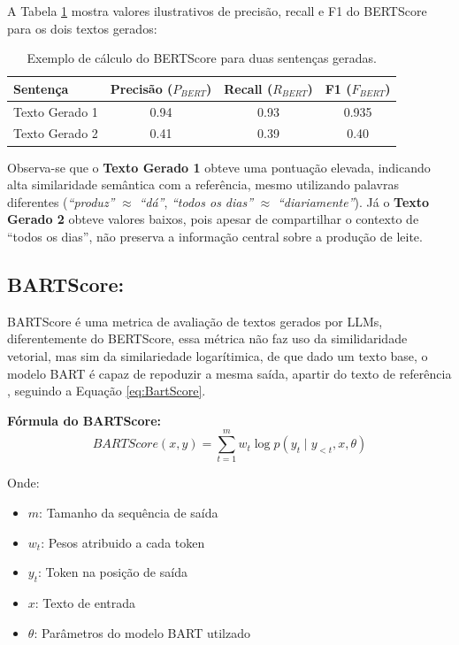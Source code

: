 A Tabela \ref{tab:exemplo_bertscore} mostra valores ilustrativos de precisão, recall e F1 do BERTScore para os dois textos gerados:

\begin{table}[H]
    \centering
    \begin{tabular}{lccc}
        \toprule
        \textbf{Sentença} & \textbf{Precisão ($P_{BERT}$)} & \textbf{Recall ($R_{BERT}$)} & \textbf{F1 ($F_{BERT}$)} \\
        \midrule
        Texto Gerado 1 & 0.94 & 0.93 & 0.935 \\
        Texto Gerado 2 & 0.41 & 0.39 & 0.40 \\
        \bottomrule
    \end{tabular}
    \caption{Exemplo de cálculo do BERTScore para duas sentenças geradas.}
    \label{tab:exemplo_bertscore}
\end{table}

Observa-se que o \textbf{Texto Gerado 1} obteve uma pontuação elevada, indicando alta similaridade semântica com a referência, mesmo utilizando palavras diferentes (\textit{``produz''} $\approx$ \textit{``dá''}, \textit{``todos os dias''} $\approx$ \textit{``diariamente''}). Já o \textbf{Texto Gerado 2} obteve valores baixos, pois apesar de compartilhar o contexto de ``todos os dias'', não preserva a informação central sobre a produção de leite.


\subsection{BARTScore:}
BARTScore é uma metrica de avaliação de textos gerados por LLMs, diferentemente do BERTScore, essa métrica não faz uso da similidaridade vetorial, mas sim da similariedade logarítimica, de que dado um texto base, o modelo BART é capaz de repoduzir a mesma saída, apartir do texto de referência \cite{NEURIPS2021_e4d2b6e6}, seguindo a Equação \ref{eq:BartScore}.
\newline

\textbf{Fórmula do BARTScore:}
\begin{equation}
    \label{eq:BartScore}
    BARTScore(x, y) = \sum_{t=1}^{m} w_t \log p(y_t \mid y_{<t}, x,\theta)
\end{equation}

Onde:
\begin{itemize}
    \item \(m\): Tamanho da sequência de saída
    \item \(w_t\): Pesos atribuido a cada token
    \item \(y_t\): Token na posição de saída
    \item \(x\): Texto de entrada
    \item \(\theta\): Parâmetros do modelo BART utilzado

\end{itemize}


